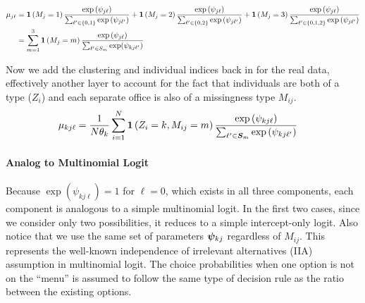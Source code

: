 \documentclass[11pt]{article}
\begin{document}
\begin{align}
\mu_{j\ell} &= \bm{1}\left(M_{j}= 1\right)\frac{\exp{(\psi_{j\ell}})}{\sum_{\ell^\prime \in \{0, 1\}}\exp{(\psi_{j\ell^\prime})}} +\bm{1}\left(M_{j}= 2\right)\frac{\exp{(\psi_{j\ell})}}{\sum_{\ell^\prime \in \{0, 2\}}\exp{(\psi_{j\ell^\prime}})}\nonumber +\bm{1}\left(M_{j}= 3\right)\frac{\exp{(\psi_{j\ell}})}{\sum_{\ell^\prime \in \{0, 1, 2\}}\exp{(\psi_{j\ell^\prime}})}\nonumber\\
&= \sum_{m = 1}^{3}\bm{1}\left(M_{j}= m\right)\frac{\exp{(\psi_{j\ell})}}{\sum_{\ell^\prime \in S_m}\exp(\psi_{kj\ell^\prime})}\nonumber
\end{align}

Now we add the clustering and individual indices back in for the real data, effectively another layer to account for the fact that individuals are both of a type (\(Z_i\)) and each separate office is also of a missingness type \(M_{ij}\). 
\begin{align}
\mu_{kj\ell} &= \frac{1}{N\theta_k}\sum^N_{i = 1}\bm{1}\left(Z_i = k, M_{ij}= m\right)\frac{\exp{(\psi_{kj\ell})}}{\sum_{\ell^\prime \in \bm{S}_{m}}\exp{(\psi_{kj\ell^\prime})}}\label{eq:missing}
\end{align}







\paragraph{Analog to Multinomial Logit} Because \(\exp(\psi_{kj\ell}) = 1\) for \(\ell = 0\), which exists in all three components, each component is analogous to a simple multinomial logit. In the first two cases, since we consider only two possibilities, it reduces to a simple intercept-only logit. Also notice that we use the same set of parameters \(\bm{\psi}_{kj}\) regardless of \(M_{ij}\). This represents the well-known independence of irrelevant alternatives (IIA) assumption in multinomial logit. The choice probabilities when one option is not on the ``menu'' is assumed to follow the same type of decision rule as the ratio between the existing options.  
\end{document}
